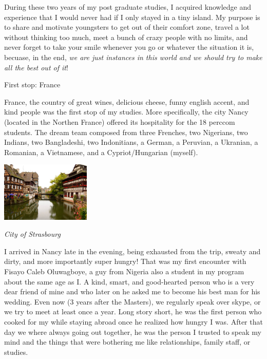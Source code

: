 \documentclass[10pt,a4paper]{article} %
\newcommand{\NewsItem}[1]{ %
\usefont{T1}{fvs}{n}{n} %
\vspace{24pt}\large #1\vspace{3pt} %
\par \normalsize \normalfont}
\begin{document}
\begin{multicols}{3}
During these two years of my post graduate studies, I acquired knowledge and 
experience that I would never had if I only stayed in a tiny island. 
My purpose is to share and motivate youngsters to get out of their comfort zone, 
travel a lot without thinking too much, meet a bunch of crazy people with no limits, 
and never forget to take your smile whenever you go or whatever the situation it is, 
becuase, in the end, \textit{we are just instances in this world and we 
should try to make all the best out of it}!


\NewsItem{First stop: France}

France, the country of great wines, delicious cheese, funny english accent, 
and kind people was the first stop of my studies. 
More specifically, the city Nancy (located in the Northen France) offered its hospitality 
for the 18 {\sc perccom} students. 
The dream team composed from three Frenches, two Nigerians, two Indians, two Bangladeshi, two 
Indonitians, a German, a Peruvian, a Ukranian, a Romanian, a Vietnamese, and a 
Cypriot/Hungarian (myself).  


\begin{center}
	\includegraphics[width=0.32\textwidth]{media/strasbourg.jpg}
	\par\textit{City of Strasbourg}
\end{center} 

I arrived in Nancy late in the evening, being exhausted from the trip, sweaty and 
dirty, and more importantly super hungry! 
That was my first encounter with Fisayo Caleb Oluwagboye, a guy from Nigeria also 
a student in my program about the same age as I. 
A kind, smart, and good-hearted person who is a very dear friend of mine 
and who later on he asked me to become his best man for his wedding.    
Even now (3 years after the Masters), we regularly speak over skype, or we try to 
meet at least once a year. 
Long story short, he was the first person who cooked for my while staying abroad 
once he realized how hungry I was. 
After that day we where always going out together, he was the person I trusted to 
speak my mind and the things that were bothering me like relationships, family staff, 
or studies. 



\end{multicols}
\end{document}
